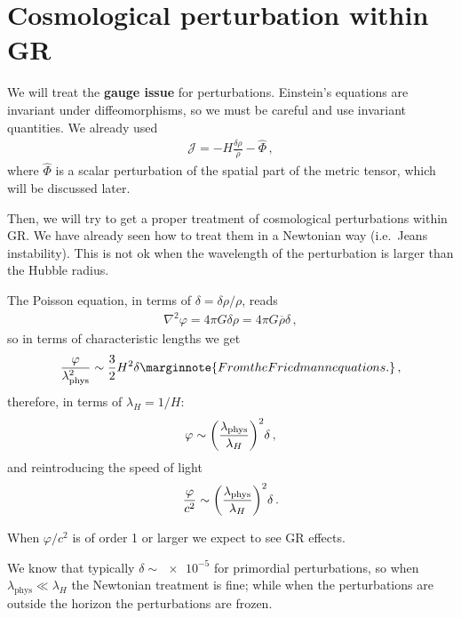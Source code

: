 \documentclass[main.tex]{subfiles}
\begin{document}
\chapter{Cosmological perturbation within GR}

We will treat the \textbf{gauge issue} for perturbations. Einstein's equations are invariant under diffeomorphisms, so we must be careful and use invariant quantities. 
We already used 
%
\begin{align}
\mathcal{J} = - H \frac{ \delta \rho}{\dot{\rho} } - \hat{\Phi}
\,,
\end{align}
%
where \(\hat{\Phi}\) is a scalar perturbation of the spatial part of the metric tensor, which will be discussed later. 

Then, we will try to get a proper treatment of cosmological perturbations within GR.
We have already seen how to treat them in a Newtonian way (i.e.\ Jeans instability). 
This is not ok when the wavelength of the perturbation is larger than the Hubble radius.

The Poisson equation, in terms of \(\delta = \delta \rho / \rho \), reads 
%
\begin{align}
\nabla^2 \varphi = 4 \pi G \delta \rho  = 4 \pi G \overline{\rho} \delta 
\,,
\end{align}
%
so in terms of characteristic lengths we get 
%
\begin{align}
\frac{\varphi}{\lambda^2 _{\text{phys}}} \sim \frac{3}{2} H^2 \delta 
\marginnote{From the Friedmann equations.}
\,,
\end{align}
%
therefore, in terms of \(\lambda _H = 1 / H\):
%
\begin{align}
\varphi \sim \qty(\frac{\lambda _{\text{phys}}}{\lambda _H})^2 \delta 
\,,
\end{align}
%
and reintroducing the speed of light 
%
\begin{align}
\frac{\varphi}{c^2} \sim \qty(\frac{\lambda _{\text{phys}}}{\lambda _H})^2 \delta 
\,.
\end{align}

When \(\varphi / c^2\) is of order 1 or larger we expect to see GR effects.

We know that typically \(\delta \sim \num{e-5}\) for primordial perturbations, so when \(\lambda _{\text{phys}} \ll \lambda _H\) the Newtonian treatment is fine; while when the perturbations are outside the horizon the perturbations are frozen. 
\end{document}
